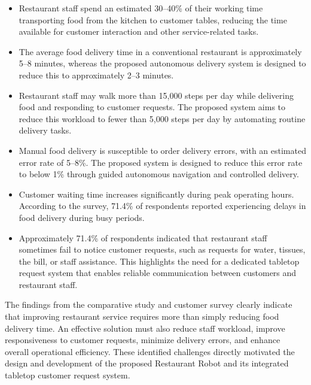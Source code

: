 \documentclass[12pt,a4paper]{article}
\begin{document}
\begin{itemize}[nosep]
    \item Restaurant staff spend an estimated 30--40\% of their working
    time transporting food from the kitchen to customer tables,
    reducing the time available for customer interaction and other
    service-related tasks.

    \item The average food delivery time in a conventional restaurant
    is approximately 5--8 minutes, whereas the proposed autonomous
    delivery system is designed to reduce this to approximately
    2--3 minutes.

    \item Restaurant staff may walk more than 15,000 steps per day
    while delivering food and responding to customer requests. The
    proposed system aims to reduce this workload to fewer than
    5,000 steps per day by automating routine delivery tasks.

    \item Manual food delivery is susceptible to order delivery errors,
    with an estimated error rate of 5--8\%. The proposed system is
    designed to reduce this error rate to below 1\% through guided
    autonomous navigation and controlled delivery.

    \item Customer waiting time increases significantly during peak
    operating hours. According to the survey, 71.4\% of respondents
    reported experiencing delays in food delivery during busy periods.

    \item Approximately 71.4\% of respondents indicated that restaurant
    staff sometimes fail to notice customer requests, such as requests
    for water, tissues, the bill, or staff assistance. This highlights
    the need for a dedicated tabletop request system that enables
    reliable communication between customers and restaurant staff.
\end{itemize}

The findings from the comparative study and customer survey clearly
indicate that improving restaurant service requires more than simply
reducing food delivery time. An effective solution must also reduce
staff workload, improve responsiveness to customer requests, minimize
delivery errors, and enhance overall operational efficiency. These
identified challenges directly motivated the design and development of
the proposed Restaurant Robot and its integrated tabletop customer
request system.
\end{document}
